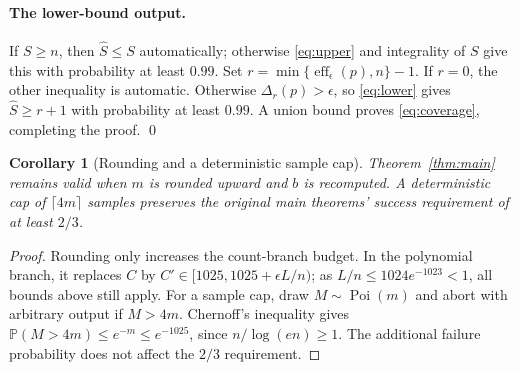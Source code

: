 \documentclass[10pt]{article}
\newtheorem{corollary}{Corollary}
\newcommand{\Prob}{\mathbb P}
\newcommand{\Poi}{\operatorname{Poi}}
\newcommand{\eff}{\operatorname{eff}}
\begin{document}
\paragraph{The lower-bound output.}
If $S\ge n$, then $\widehat S\le S$ automatically; otherwise
\eqref{eq:upper} and integrality of $S$ give this with probability at least
$0.99$. Set $r=\min\{\eff_\epsilon(p),n\}-1$. If $r=0$, the other
inequality is automatic. Otherwise $\Delta_r(p)>\epsilon$, so
\eqref{eq:lower} gives $\widehat S\ge r+1$ with probability at least $0.99$.
A union bound proves \eqref{eq:coverage}, completing the proof.
\qed

\begin{corollary}[Rounding and a deterministic sample cap]\label{cor:rounding}
Theorem~\ref{thm:main} remains valid when $m$ is rounded upward and $b$ is
recomputed. A deterministic cap of $\lceil4m\rceil$ samples preserves the
original main theorems' success requirement of at least $2/3$.
\end{corollary}
\begin{proof}
Rounding only increases the count-branch budget. In the polynomial branch,
it replaces $C$ by $C'\in[1025,1025+\epsilon L/n)$; as
$L/n\le1024e^{-1023}<1$, all bounds above still apply.
For a sample cap, draw $M\sim\Poi(m)$ and abort with arbitrary output if
$M>4m$. Chernoff's inequality gives
$\Prob(M>4m)\le e^{-m}\le e^{-1025}$, since $n/\log(en)\ge1$.
The additional failure probability does not affect the $2/3$ requirement.
\end{proof}
\end{document}
